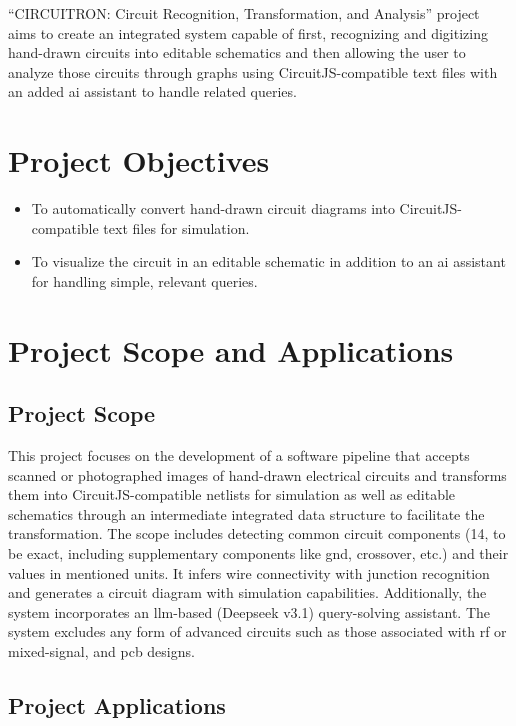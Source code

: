``CIRCUITRON: Circuit Recognition, Transformation, and Analysis'' project aims to create an integrated system capable of first, recognizing and digitizing hand-drawn circuits into editable schematics and then allowing the user to analyze those circuits through graphs using CircuitJS-compatible text files with an added \gls{ai} assistant to handle related queries.

\section{Project Objectives}

\begin{itemize}
    \item To automatically convert hand-drawn circuit diagrams into CircuitJS-compatible text files for simulation.
    \item To visualize the circuit in an editable schematic in addition to an \gls{ai} assistant for handling simple, relevant queries.
\end{itemize}

\section{Project Scope and Applications}

\subsection{Project Scope}

This project focuses on the development of a software pipeline that accepts scanned or photographed images of hand-drawn electrical circuits and transforms them into CircuitJS-compatible netlists for simulation as well as editable schematics through an intermediate integrated data structure to facilitate the transformation. The scope includes detecting common circuit components (14, to be exact, including supplementary components like gnd, crossover, etc.) and their values in mentioned units. It infers wire connectivity with junction recognition and generates a circuit diagram with simulation capabilities. Additionally, the system incorporates an \gls{llm}-based (Deepseek v3.1) query-solving assistant. The system excludes any form of advanced circuits such as those associated with \gls{rf} or mixed-signal, and \gls{pcb} designs.

\subsection{Project Applications}

